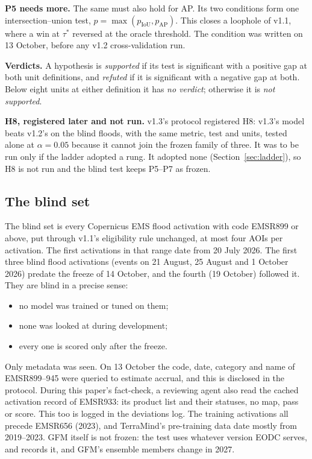 \documentclass[10pt,twocolumn,a4paper]{article}
\begin{document}
\textbf{P5 needs more.} The same must also hold for AP. Its two conditions form one intersection--union test,
$p=\max(p_{\mathrm{IoU}}, p_{\mathrm{AP}})$. This closes a loophole of v1.1, where a win at $\tau^{*}$ reversed at
the oracle threshold. The condition was written on 13 October, before any v1.2 cross-validation run.

\textbf{Verdicts.} A hypothesis is \emph{supported} if its test is significant with a positive gap at both unit
definitions, and \emph{refuted} if it is significant with a negative gap at both. Below eight units at either
definition it has \emph{no verdict}; otherwise it is \emph{not supported}.

\textbf{H8, registered later and not run.} v1.3's protocol registered H8: v1.3's model beats v1.2's on the blind
floods, with the same metric, test and units, tested alone at $\alpha=0.05$ because it cannot join the frozen family
of three. It was to be run only if the ladder adopted a rung. It adopted none (Section~\ref{sec:ladder}), so H8 is not
run and the blind test keeps P5--P7 as frozen.

\subsection{The blind set}
The blind set is every Copernicus EMS flood activation with code EMSR899 or above, put through v1.1's eligibility rule
unchanged, at most four AOIs per activation. The first activations in that range date from 20 July 2026. The first
three blind flood activations (events on 21 August, 25 August and 1 October 2026) predate the freeze of 14 October,
and the fourth (19 October) followed it. They are blind in a precise sense:
\begin{itemize}
  \item no model was trained or tuned on them;
  \item none was looked at during development;
  \item every one is scored only after the freeze.
\end{itemize}
Only metadata was seen. On 13 October the code, date, category and name of EMSR899--945 were queried to estimate
accrual, and this is disclosed in the protocol. During this paper's fact-check, a reviewing agent also read the cached
activation record of EMSR933: its product list and their statuses, no map, pass or score. This too is logged in the
deviations log. The training activations all precede EMSR656 (2023), and TerraMind's pre-training data date mostly
from 2019--2023. GFM itself is not frozen: the test uses whatever version EODC serves, and records it, and GFM's
ensemble members change in 2027.
\end{document}
